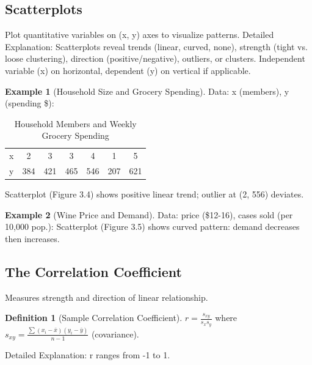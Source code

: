 \documentclass{article}
\theoremstyle{definition}
\newtheorem{definition}{Definition}
\newtheorem{example}{Example}
\begin{document}
	\subsection{Scatterplots}
	Plot quantitative variables on (x, y) axes to visualize patterns.
	Detailed Explanation: Scatterplots reveal trends (linear, curved, none), strength (tight vs. loose clustering), direction (positive/negative), outliers, or clusters. Independent variable (x) on horizontal, dependent (y) on vertical if applicable.
	\begin{example}[Household Size and Grocery Spending]
		Data: x (members), y (spending \$):
		\begin{table}[ht]
			\centering
			\begin{tabular}{ccccccc}
				\toprule
				x & 2 & 3 & 3 & 4 & 1 & 5 \\
				y & 384 & 421 & 465 & 546 & 207 & 621 \\
				\bottomrule
			\end{tabular}
			\caption{Household Members and Weekly Grocery Spending}
		\end{table}
		Scatterplot (Figure 3.4) shows positive linear trend; outlier at (2, 556) deviates.
	\end{example}
	\begin{example}[Wine Price and Demand]
		Data: price (\$12-16), cases sold (per 10,000 pop.):
		Scatterplot (Figure 3.5) shows curved pattern: demand decreases then increases.
	\end{example}
	\subsection{The Correlation Coefficient}
	Measures strength and direction of linear relationship.
	\begin{definition}[Sample Correlation Coefficient]
		$   r = \frac{s_{xy}}{s_x s_y}   $
		where $  s_{xy} = \frac{\sum (x_i - \bar{x})(y_i - \bar{y})}{n-1}  $ (covariance).
	\end{definition}
	Detailed Explanation: r ranges from -1 to 1.
	
\end{document}
